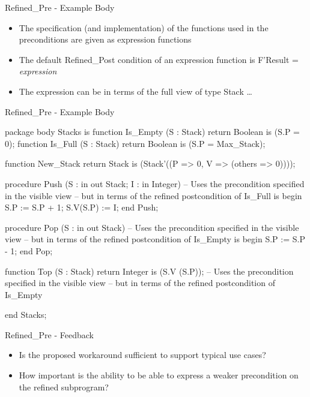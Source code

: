 \documentclass{beamer}
\begin{document}
\begin{frame}[fragile]{Refined\_Pre - Example Body}

  \begin{itemize}

    \item The specification (and implementation) of the functions used
      in the preconditions are given as expression functions
    \item The default Refined\_Post condition of an expression
      function is F'Result = \emph{expression}
   \item The expression can be in terms of the full view of type Stack \ldots
  \end{itemize}

\end{frame}
\begin{frame}[fragile]{Refined\_Pre - Example Body}

  \begin{pxcode}[language=SPARK,style=tinystyle,gobble=4]
    package body Stacks
    is
       function Is_Empty (S : Stack) return Boolean is (S.P = 0);
       function Is_Full (S : Stack) return Boolean is (S.P = Max_Stack);
    
       function New_Stack return Stack is (Stack'((P => 0, V => (others => 0))));
    
       procedure Push (S : in out Stack; I : in Integer)
         -- Uses the precondition specified in the visible view
         -- but in terms of the refined postcondition of Is\_Full
       is
       begin
          S.P := S.P + 1;
          S.V(S.P) := I;
       end Push;
    
       procedure Pop (S : in out Stack)
         -- Uses the precondition specified in the visible view
         -- but in terms of the refined postcondition of Is\_Empty
       is
       begin
          S.P := S.P - 1;
       end Pop;
    
       function Top (S : Stack) return Integer is (S.V (S.P));
       -- Uses the precondition specified in the visible view
       -- but in terms of the refined postcondition of Is\_Empty
    
    end Stacks;
 \end{pxcode}

\end{frame}

\begin{frame}{Refined\_Pre - Feedback}

  \begin{itemize}
  \item Is the proposed workaround sufficient to support typical use cases?
  \item How important is the ability to be able to express a weaker precondition on the refined subprogram?
  \end{itemize}
 
\end{frame}
\end{document}
